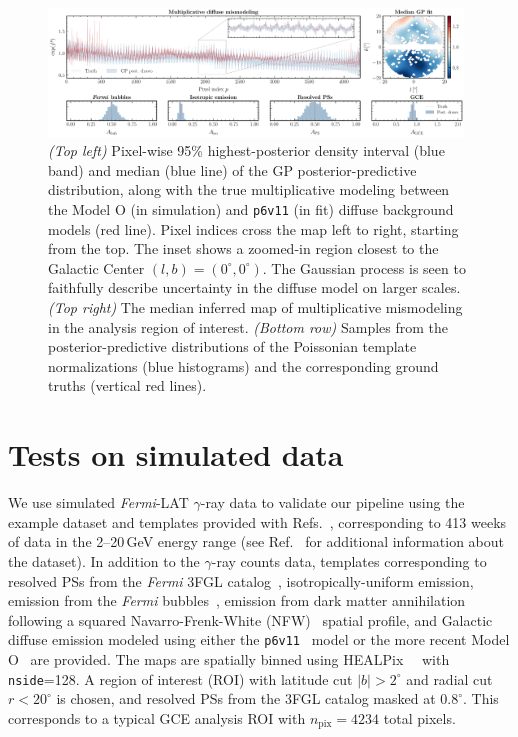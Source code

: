 \documentclass[]{article}
\begin{document}
\begin{figure}[!t]
\centering
\includegraphics[width=0.98\textwidth]{figures/inference}
\caption{\emph{(Top left)} Pixel-wise 95\% highest-posterior density interval (blue band) and median (blue line) of the GP posterior-predictive distribution, along with the true multiplicative modeling between the Model O (in simulation) and \texttt{p6v11} (in fit) diffuse background models (red line). Pixel indices cross the map left to right, starting from the top. The inset shows a zoomed-in region closest to the Galactic Center $(l, b) = (0^\circ, 0^\circ)$. The Gaussian process is seen to faithfully describe uncertainty in the diffuse model on larger scales. \emph{(Top right)} The median inferred map of multiplicative mismodeling in the analysis region of interest. \emph{(Bottom row)} Samples from the posterior-predictive distributions of the Poissonian template normalizations (blue histograms) and the corresponding ground truths (vertical red lines).}
\label{fig:experiment}
\end{figure}

\section{Tests on simulated data}
\label{sec:experiments}

We use simulated \emph{Fermi}-LAT $\gamma$-ray data to validate our pipeline using the example dataset and templates provided with Refs.~\cite{Mishra-Sharma:2016gis,Buschmann:2020adf}, corresponding to 413 weeks of data in the 2--20\,GeV energy range (see Ref.~\cite{Mishra-Sharma:2016gis} for additional information about the dataset). In addition to the $\gamma$-ray counts data, templates corresponding to resolved PSs from the \emph{Fermi} 3FGL catalog~\cite{Acero:2015hja}, isotropically-uniform emission, emission from the \emph{Fermi} bubbles~\cite{Su:2010qj}, emission from dark matter annihilation following a squared Navarro-Frenk-White (NFW)~\cite{Navarro:1995iw,Navarro:1996gj} spatial profile, and Galactic diffuse emission modeled using either the \texttt{p6v11}~\cite{p6v11} model or the more recent Model O~\cite{Buschmann:2020adf} are provided. The maps are spatially binned using HEALPix~~\cite{Gorski:2004by,Zonca2019} with \texttt{nside}=128. A region of interest (ROI) with latitude cut $|b| > 2^\circ$ and radial cut $r < 20^\circ$ is chosen, and resolved PSs from the 3FGL catalog masked at $0.8^\circ$. This corresponds to a typical GCE analysis ROI with $n_\mathrm{pix}=4234$ total pixels. 
\end{document}
